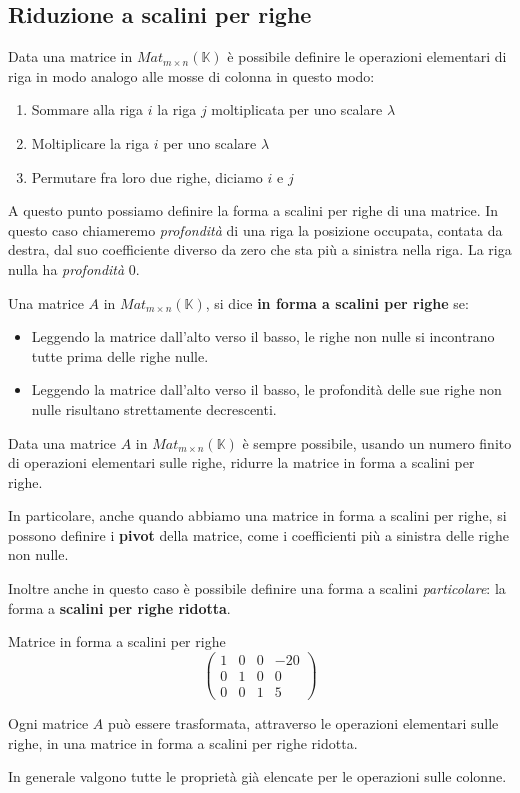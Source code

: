 
\subsection{Riduzione a scalini per righe}
Data una matrice in $Mat_{m \times n}(\mathbb{K})$ \`e possibile definire le
operazioni elementari di riga in modo analogo alle mosse di colonna in questo
modo:
\begin{enumerate}
	\item Sommare alla riga $i$ la riga $j$ moltiplicata per uno scalare $\lambda$
	\item Moltiplicare la riga $i$ per uno scalare $\lambda$
	\item Permutare fra loro due righe, diciamo $i$ e $j$
\end{enumerate}
A questo punto possiamo definire la forma a scalini per righe di una matrice.
In questo caso chiameremo \emph{profondit\`a} di una riga la posizione occupata,
contata da destra, dal suo coefficiente diverso da zero che sta pi\`u a sinistra
nella riga. La riga nulla ha \emph{profondit\`a} 0.

\begin{defn}
	Una matrice $A$ in $Mat_{m \times n}(\mathbb{K})$, si dice \textbf{in forma
		a scalini per righe} se:
	\begin{itemize}
		\item Leggendo la matrice dall'alto verso il basso, le righe non nulle si
		      incontrano tutte prima delle righe nulle.
		\item Leggendo la matrice dall'alto verso il basso, le profondit\`a
		      delle sue righe non nulle risultano strettamente decrescenti.
	\end{itemize}
\end{defn}

\begin{theorem}
	Data una matrice $A$ in $Mat_{m \times n}(\mathbb{K})$ \`e sempre possibile,
	usando un numero finito di operazioni elementari sulle righe, ridurre la
	matrice in forma a scalini per righe.
\end{theorem}

In particolare, anche quando abbiamo una matrice in forma a scalini per righe, si
possono definire i \textbf{pivot} della matrice, come i coefficienti pi\`u a
sinistra delle righe non nulle.

Inoltre anche in questo caso \`e possibile definire una forma a scalini
\emph{particolare}: la forma a \textbf{scalini per righe ridotta}.

\begin{example}
	Matrice in forma a scalini per righe
	\begin{equation*}
		\begin{pmatrix}
			1 & 0 & 0 & -20 \\
			0 & 1 & 0 & 0   \\
			0 & 0 & 1 & 5
		\end{pmatrix}
	\end{equation*}
\end{example}

\begin{corollary}
	Ogni matrice $A$ pu\`o essere trasformata, attraverso le operazioni elementari
	sulle righe, in una matrice in forma a scalini per righe ridotta.
\end{corollary}

In generale valgono tutte le propriet\`a gi\`a elencate per le operazioni sulle 
colonne. 